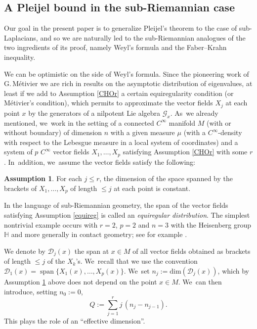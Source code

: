 \documentclass[10pt]{amsart}
\DeclareMathOperator{\Span}{span}
\theoremstyle{definition}
\newtheorem{assumption}[theorem]{Assumption}
\newcommand{\1}{\mathbbm{1}}
\begin{document}
\subsection{A Pleijel bound in the sub-Riemannian case}
Our goal in the present paper is to generalize Pleijel's theorem to the case of sub-Laplacians, and so we are naturally led to the sub-Riemannian analogues of the two ingredients of its proof, namely Weyl's formula and the Faber--Krahn inequality.

We can be optimistic on the side of Weyl's formula. Since the pioneering work of G.\,Métivier \cite{Me} we are rich in results on the asymptotic distribution of eigenvalues, at least if we add to Assumption \ref{CHOr} a certain equiregularity condition (or Métivier's condition), which permits to approximate the vector fields $X_j$ at each point $x$ by the generators of a nilpotent Lie algebra $\mathcal G_x$. As~we already mentioned, we~work in the setting of a connected $C^\infty$ manifold $M$ (with or without boundary) of dimension $n$ with a given measure $\mu$ (with a $C^\infty$-density with respect to the Lebesgue measure in a local system of coordinates) and a system of $p$ $C^\infty$ vector fields $X_1,\ldots,X_p$ satisfying Assumption \ref{CHOr} with some $r$. In~addition, we~assume the vector fields satisfy the following:

\begin{assumption}\label{equireg}
For each $j\leq r$, the dimension of the space spanned by the brackets of $X_1,\ldots,X_p$ of length $\leq j$ at each point is constant.
\end{assumption}

In the language of sub-Riemannian geometry, the span of the vector fields satisfying Assumption \eqref{equireg} is called an \emph{equiregular distribution}. The simplest nontrivial example occurs with $r=2$, $p=2$ and $n=3$ with the Heisenberg group $\mathbb H$ and more generally in contact geometry; see for example \cite{AgBaBo,ArRi}.

We denote by $\mathcal{D}_j(x)$ the span at $x\in M$ of all vector fields obtained as brackets of length $\leq j$ of the $X_k$'s. We~recall that we use the convention $\mathcal D_1(x)=\allowbreak\Span\{X_1(x),\ldots,X_p(x)\}$. We~set $n_j :=\text{dim}(\mathcal{D}_j(x))$, which by Assumption \ref{equireg} above does not depend on the point $x\in M$. We~can then introduce, setting $n_0:=0$,\vspace*{-5pt}\enlargethispage{.5\baselineskip}
\begin{equation}\label{eq:defQ}
Q:= \sum_{j=1}^r j \,(n_j-n_{j-1}).
\end{equation}
This plays the role of an ``effective dimension''.
\end{document}
